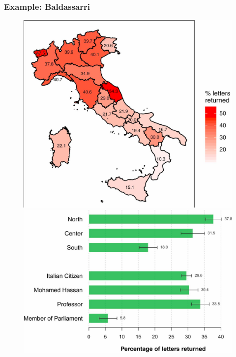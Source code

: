 \documentclass[12pt,english,dvipsnames,aspectratio=169,handout]{beamer}\usepackage[]{graphicx}\usepackage[]{xcolor}
\begin{document}
\begin{frame}
	\frametitle{Example: Baldassarri \citeyear{baldassarri_market_2020}}
    \begin{figure}[ht]
        \begin{minipage}[b]{0.45\linewidth}
            \centering
            \includegraphics[width=\textwidth]{../04-figures/12/13-w12_lostletter2}
        \end{minipage}
        \hspace{0.5cm}
        \begin{minipage}[b]{0.45\linewidth}
            \centering
            \includegraphics[width=\textwidth]{../04-figures/12/14-w12_lostletter1}
        \end{minipage}
    \end{figure}
\end{frame}
\end{document}
